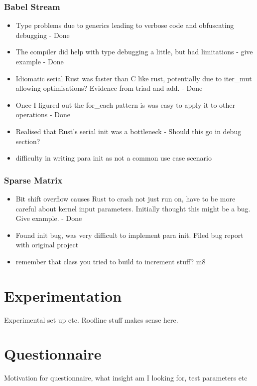 \subsubsection{Babel Stream}
\begin{itemize}
  \item Type problems due to generics leading to verbose code and obfuscating debugging - Done
  \item The compiler did help with type debugging a little, but had limitations - give example - Done
  \item Idiomatic serial Rust was faster than C like rust, potentially due to iter\_mut allowing optimisations? Evidence from triad and add. - Done
  \item Once I figured out the for\_each pattern is was easy to apply it to other operations - Done
  \item Realised that Rust's serial init was a bottleneck - Should this go in debug section?
  \item difficulty in writing para init as not a common use case scenario
\end{itemize}

\subsubsection{Sparse Matrix}
\begin{itemize}
  \item Bit shift overflow causes Rust to crash not just run on, have to be more careful about kernel input parameters. Initially thought this might be a bug. Give example. - Done
  \item Found init bug, was very difficult to implement para init. Filed bug report with original project
  \item remember that class you tried to build to increment stuff? m8
\end{itemize}

\section{Experimentation}
Experimental set up etc. Roofline stuff makes sense here.
\section{Questionnaire}
Motivation for questionnaire, what insight am I looking for, test parameters etc
